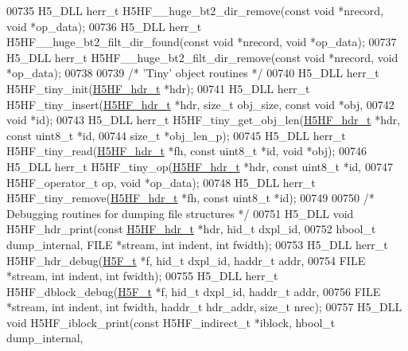 \begin{DoxyCode}
00735 H5\_DLL herr\_t H5HF\_\_huge\_bt2\_dir\_remove(\textcolor{keyword}{const} \textcolor{keywordtype}{void} *nrecord, \textcolor{keywordtype}{void} *op\_data);
00736 H5\_DLL herr\_t H5HF\_\_huge\_bt2\_filt\_dir\_found(\textcolor{keyword}{const} \textcolor{keywordtype}{void} *nrecord, \textcolor{keywordtype}{void} *op\_data);
00737 H5\_DLL herr\_t H5HF\_\_huge\_bt2\_filt\_dir\_remove(\textcolor{keyword}{const} \textcolor{keywordtype}{void} *nrecord, \textcolor{keywordtype}{void} *op\_data);
00738 
00739 \textcolor{comment}{/* 'Tiny' object routines */}
00740 H5\_DLL herr\_t H5HF\_tiny\_init(\hyperlink{struct_h5_h_f__hdr__t}{H5HF\_hdr\_t} *hdr);
00741 H5\_DLL herr\_t H5HF\_tiny\_insert(\hyperlink{struct_h5_h_f__hdr__t}{H5HF\_hdr\_t} *hdr, \textcolor{keywordtype}{size\_t} obj\_size, \textcolor{keyword}{const} \textcolor{keywordtype}{void} *obj,
00742     \textcolor{keywordtype}{void} *\textcolor{keywordtype}{id});
00743 H5\_DLL herr\_t H5HF\_tiny\_get\_obj\_len(\hyperlink{struct_h5_h_f__hdr__t}{H5HF\_hdr\_t} *hdr, \textcolor{keyword}{const} uint8\_t *\textcolor{keywordtype}{id},
00744     \textcolor{keywordtype}{size\_t} *obj\_len\_p);
00745 H5\_DLL herr\_t H5HF\_tiny\_read(\hyperlink{struct_h5_h_f__hdr__t}{H5HF\_hdr\_t} *fh, \textcolor{keyword}{const} uint8\_t *\textcolor{keywordtype}{id}, \textcolor{keywordtype}{void} *obj);
00746 H5\_DLL herr\_t H5HF\_tiny\_op(\hyperlink{struct_h5_h_f__hdr__t}{H5HF\_hdr\_t} *hdr, \textcolor{keyword}{const} uint8\_t *\textcolor{keywordtype}{id},
00747     H5HF\_operator\_t op, \textcolor{keywordtype}{void} *op\_data);
00748 H5\_DLL herr\_t H5HF\_tiny\_remove(\hyperlink{struct_h5_h_f__hdr__t}{H5HF\_hdr\_t} *fh, \textcolor{keyword}{const} uint8\_t *\textcolor{keywordtype}{id});
00749 
00750 \textcolor{comment}{/* Debugging routines for dumping file structures */}
00751 H5\_DLL \textcolor{keywordtype}{void} H5HF\_hdr\_print(\textcolor{keyword}{const} \hyperlink{struct_h5_h_f__hdr__t}{H5HF\_hdr\_t} *hdr, hid\_t dxpl\_id,
00752     hbool\_t dump\_internal, FILE *stream, \textcolor{keywordtype}{int} indent, \textcolor{keywordtype}{int} fwidth);
00753 H5\_DLL herr\_t H5HF\_hdr\_debug(\hyperlink{struct_h5_f__t}{H5F\_t} *f, hid\_t dxpl\_id, haddr\_t addr,
00754     FILE *stream, \textcolor{keywordtype}{int} indent, \textcolor{keywordtype}{int} fwidth);
00755 H5\_DLL herr\_t H5HF\_dblock\_debug(\hyperlink{struct_h5_f__t}{H5F\_t} *f, hid\_t dxpl\_id, haddr\_t addr,
00756     FILE *stream, \textcolor{keywordtype}{int} indent, \textcolor{keywordtype}{int} fwidth, haddr\_t hdr\_addr, \textcolor{keywordtype}{size\_t} nrec);
00757 H5\_DLL \textcolor{keywordtype}{void} H5HF\_iblock\_print(\textcolor{keyword}{const} H5HF\_indirect\_t *iblock, hbool\_t dump\_internal,

\end{DoxyCode}
